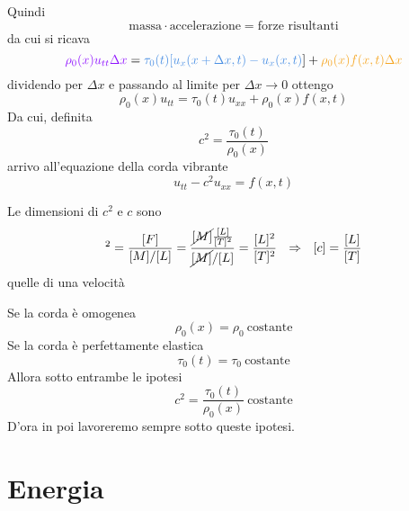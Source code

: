 \documentclass[10pt,a4paper,twoside,openright]{book}
\begin{document}
Quindi
\begin{equation*}
    \text{massa} \cdotp \text{accelerazione} =\text{forze risultanti}
\end{equation*}
da cui si ricava
\begin{equation*}
    \textcolor[rgb]{0.56,0.07,1}{\rho _{0}(x) u_{tt} \Delta x} =\textcolor[rgb]{0.29,0.56,0.89}{\tau _{0}(t)[u_{x}(x+\Delta x,t)-u_{x}(x,t)}] +\textcolor[rgb]{0.96,0.65,0.14}{\rho _{0}(x)f(x,t)\Delta x}
\end{equation*}
dividendo per $\displaystyle \Delta x$ e passando al limite per $\displaystyle \Delta x\rightarrow 0$ ottengo
\begin{equation*}
    \rho _{0}(x) u_{tt} =\tau _{0}(t) u_{xx} +\rho _{0} (x)f(x,t)
\end{equation*}
Da cui, definita
\begin{equation*}
    c^{2} =\frac{\tau _{0}(t)}{\rho _{0}(x)}
\end{equation*}
arrivo all'equazione della corda vibrante
\begin{equation}
    \boxed{u_{tt} -c^{2} u_{xx} =f(x,t)}
\end{equation}
\begin{nb}
    Le dimensioni di $\displaystyle c^{2}$ e $c$ sono
    \begin{equation*}
        [ c]^{2} =\frac{[ F]}{[ M] /[ L]} =\frac{\cancel{[ M]}\frac{[ L]}{[ T]^{2}}}{\cancel{[ M]} /[ L]} =\frac{[ L]^{2}}{[ T]^{2}} \ \ \Rightarrow \ \ [ c] =\frac{[ L]}{[ T]}
    \end{equation*}
    quelle di una velocità
\end{nb}
\begin{nb}
    Se la corda è omogenea
    \begin{equation*}
        \rho _{0}(x) =\rho _{0} \ \text{costante}
    \end{equation*}
    Se la corda è perfettamente elastica
    \begin{equation*}
        \tau _{0}(t) =\tau _{0} \ \text{costante}
    \end{equation*}
    Allora sotto entrambe le ipotesi
    \begin{equation*}
        c^{2} =\frac{\tau _{0}(t)}{\rho _{0}(x)} \ \text{costante}
    \end{equation*}
    D'ora in poi lavoreremo sempre sotto queste ipotesi.
\end{nb}
\section{Energia}
\end{document}

